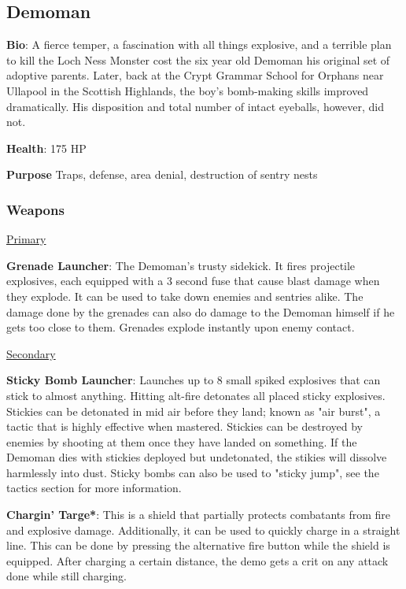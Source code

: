 \subsection{Demoman}
{\bf Bio}:
A fierce temper, a fascination with all things explosive, and a terrible plan to kill the Loch Ness Monster cost the six year old Demoman his original set of adoptive parents. Later, back at the Crypt Grammar School for Orphans near Ullapool in the Scottish Highlands, the boy's bomb-making skills improved dramatically. His disposition and total number of intact eyeballs, however, did not.

{\bf Health}: 175 HP

{\bf Purpose}
Traps, defense, area denial, destruction of sentry nests

\subsubsection {Weapons}


\begin {center}
\underline {Primary}
\end {center}

{\bf Grenade Launcher}: The Demoman's trusty sidekick. It fires projectile explosives, each equipped with a 3 second fuse that cause blast damage when they explode. It can be used to take down enemies and sentries alike. The damage done by the grenades can also do damage to the Demoman himself if he gets too close to them. Grenades explode instantly upon enemy contact.

\begin {center}
\underline {Secondary}
\end {center}

{\bf Sticky Bomb Launcher}: Launches up to 8 small spiked explosives that can stick to almost anything. Hitting alt-fire detonates all placed sticky explosives. Stickies can be detonated in mid air before they land; known as "air burst", a tactic that is highly effective when mastered. Stickies can be destroyed by enemies by shooting at them once they have landed on something. If the Demoman dies with stickies deployed but undetonated, the stikies will dissolve harmlessly into dust. Sticky bombs can also be used to "sticky jump", see the tactics section for more information. 

{\bf Chargin' Targe*}: This is a shield that partially protects combatants from fire and explosive damage. Additionally, it can be used to quickly charge in a straight line. This can be done by pressing the alternative fire button while the shield is equipped. After charging a certain distance, the demo gets a crit on any attack done while still charging. 

